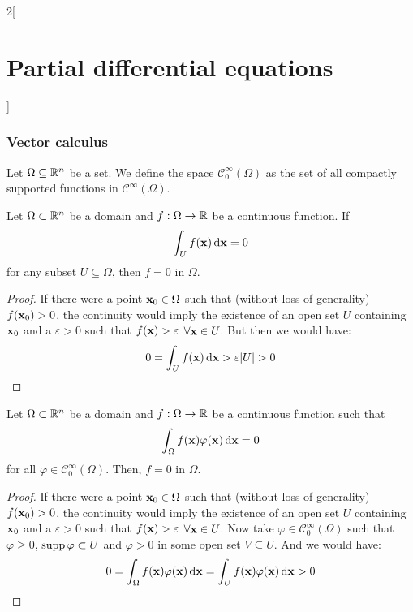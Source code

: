 \documentclass[../../../main_math.tex]{subfiles}
\begin{document}
\begin{multicols}{2}[\section{Partial differential equations}]
  \subsubsection{Vector calculus}
  \begin{definition}
    Let $\Omega\subseteq \mathbb{R}^n$ be a set. We define the space $\mathcal{C}_0^\infty(\Omega)$ as the set of all compactly supported functions in $\mathcal{C}^\infty(\Omega)$.
  \end{definition}
  \begin{important}
    \begin{theorem}\label{PDE:fundamentallemma}
      Let $\Omega\subset\mathbb{R}^n$ be a domain and $f:\Omega\rightarrow\mathbb{R}$ be a continuous function. If $$\int_U f(\boldsymbol{\mathrm{x}})\dd{\boldsymbol{\mathrm{x}}}=0$$ for any subset  $U\subseteq\Omega$, then $f=0$ in $\Omega$.
    \end{theorem}
  \end{important}
  \begin{proof}
    If there were a point $\boldsymbol{\mathrm{x}}_0\in \Omega$ such that (without loss of generality) $f(\boldsymbol{\mathrm{x}}_0)>0$, the continuity would imply the existence of an open set $U$ containing $\boldsymbol{\mathrm{x}}_0$ and a $\varepsilon >0$ such that $f(\boldsymbol{\mathrm{x}})>\varepsilon$ $\forall \boldsymbol{\mathrm{x}}\in U$. But then we would have: $$0=\int_U f(\boldsymbol{\mathrm{x}})\dd{\boldsymbol{\mathrm{x}}}>\varepsilon\abs{U}>0$$
  \end{proof}
  \begin{corollary}\label{PDE:postfundamentallemma}
    Let $\Omega\subset\mathbb{R}^n$ be a domain and $f:\Omega\rightarrow\mathbb{R}$ be a continuous function such that $$\int_\Omega f(\boldsymbol{\mathrm{x}})\varphi(\boldsymbol{\mathrm{x}})\dd{\boldsymbol{\mathrm{x}}}=0$$ for all $\varphi\in\mathcal{C}_0^\infty(\Omega)$. Then, $f=0$ in $\Omega$.
  \end{corollary}
  \begin{proof}
    If there were a point $\boldsymbol{\mathrm{x}}_0\in \Omega$ such that (without loss of generality) $f(\boldsymbol{\mathrm{x}}_0)>0$, the continuity would imply the existence of an open set $U$ containing $\boldsymbol{\mathrm{x}}_0$ and a $\varepsilon >0$ such that $f(\boldsymbol{\mathrm{x}})>\varepsilon$ $\forall \boldsymbol{\mathrm{x}}\in U$. Now take $\varphi\in\mathcal{C}_0^\infty(\Omega)$ such that $\varphi\geq 0$, $\operatorname{supp}\varphi\subset U$ and $\varphi>0$ in some open set $V\subseteq U$. And we would have: $$0=\int_\Omega f(\boldsymbol{\mathrm{x}})\varphi(\boldsymbol{\mathrm{x}})\dd{\boldsymbol{\mathrm{x}}}=\int_U f(\boldsymbol{\mathrm{x}})\varphi(\boldsymbol{\mathrm{x}})\dd{\boldsymbol{\mathrm{x}}}>0$$

\end{proof}
\end{multicols}
\end{document}
